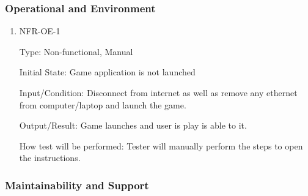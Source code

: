 \documentclass[12pt, titlepage]{article}
\begin{document}
\subsubsection{Operational and Environment}

\begin{enumerate}

\item{NFR-OE-1\\}

Type: Non-functional, Manual
					
Initial State: Game application is not launched 
					
Input/Condition: Disconnect from internet as well as remove any ethernet from computer/laptop and launch the game.
					
Output/Result: Game launches and user is play is able to it.
					
How test will be performed: Tester will manually perform the steps to open the instructions.

\end{enumerate}

\subsubsection{Maintainability and Support}
\end{document}
